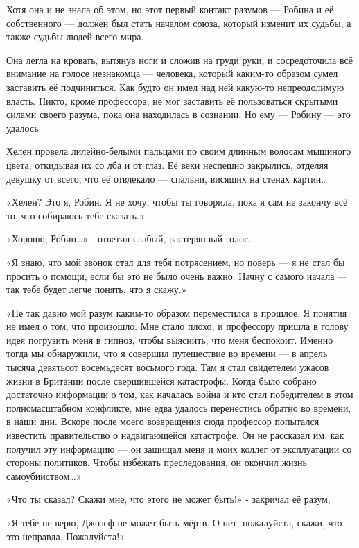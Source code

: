 \documentclass[a4paper,12pt]{book}
\begin{document}
Хотя она и не знала об этом, но этот первый контакт разумов — Робина и её собственного — должен был стать началом союза, который изменит их судьбы, а также судьбы людей всего мира.
\par
Она легла на кровать, вытянув ноги и сложив на груди руки, и сосредоточила всё внимание на голосе незнакомца — человека, который каким-то образом сумел заставить её подчиниться. Как будто он имел над ней какую-то непреодолимую власть. Никто, кроме профессора, не мог заставить её пользоваться скрытыми силами своего разума, пока она находилась в сознании. Но ему — Робину — это удалось.
\par
Хелен провела лилейно-белыми пальцами по своим длинным волосам мышиного цвета, откидывая их со лба и от глаз. Её веки неспешно закрылись, отделяя девушку от всего, что её отвлекало — спальни, висящих на стенах картин…\\
\par
«Хелен? Это я, Робин. Я не хочу, чтобы ты говорила, пока я сам не закончу всё то, что собираюсь тебе сказать.»
\par
«Хорошо, Робин…» - ответил слабый, растерянный голос.
\par
«Я знаю, что мой звонок стал для тебя потрясением, но поверь — я не стал бы просить о помощи, если бы это не было очень важно. Начну с самого начала — так тебе будет легче понять, что я скажу.»
\par
«Не так давно мой разум каким-то образом переместился в прошлое. Я понятия не имел о том, что произошло. Мне стало плохо, и профессору пришла в голову идея погрузить меня в гипноз, чтобы выяснить, что меня беспокоит. Именно тогда мы обнаружили, что я совершил путешествие во времени — в апрель тысяча девятьсот восемьдесят восьмого года. Там я стал свидетелем ужасов жизни в Британии после свершившейся катастрофы. Когда было собрано достаточно информации о том, как началась война и кто стал победителем в этом полномасштабном конфликте, мне едва удалось перенестись обратно во времени, в наши дни. Вскоре после моего возвращения сюда профессор попытался известить правительство о надвигающейся катастрофе. Он не рассказал им, как получил эту информацию — он защищал меня и моих коллег от эксплуатации со стороны политиков. Чтобы избежать преследования, он окончил жизнь самоубийством…»
\par
«Что ты сказал? Скажи мне, что этого не может быть!» - закричал её разум,
\par
«Я тебе не верю, Джозеф не может быть мёртв. О нет, пожалуйста, скажи, что это неправда. Пожалуйста!»
\end{document}
